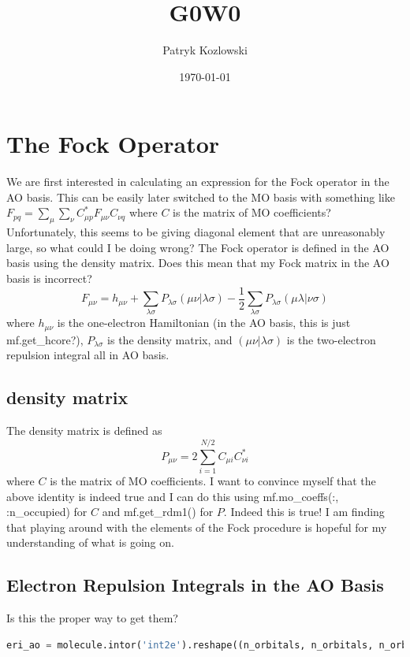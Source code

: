 \documentclass[12pt]{article}
\author{Patryk Kozlowski}
\title{G0W0}
\date{\today}
\begin{document}
\maketitle
\section{The Fock Operator}
We are first interested in calculating an expression for the Fock operator in the AO basis. This can be easily later switched to the MO basis with something like $F_{pq} = \sum_{\mu} \sum_{\nu} C_{\mu p}^{*}F_{\mu\nu}C_{\nu q}$ where $C$ is the matrix of MO coefficients? Unfortunately, this seems to be giving diagonal element that are unreasonably large, so what could I be doing wrong? 
The Fock operator is defined in the AO basis using the density matrix. Does this mean that my Fock matrix in the AO basis is incorrect? 
\begin{equation}
F_{\mu\nu} = h_{\mu\nu} + \sum_{\lambda\sigma}P_{\lambda\sigma}(\mu\nu|\lambda\sigma) - \frac{1}{2}\sum_{\lambda\sigma}P_{\lambda\sigma}(\mu\lambda|\nu\sigma)
\end{equation}
where $h_{\mu\nu}$ is the one-electron Hamiltonian (in the AO basis, this is just mf.get\_hcore?), $P_{\lambda\sigma}$ is the density matrix, and $(\mu\nu|\lambda\sigma)$ is the two-electron repulsion integral all in AO basis.
\subsection{density matrix}
The density matrix is defined as
\begin{equation}
P_{\mu\nu} = 2\sum_{i=1}^{N/2}C_{\mu i}C_{\nu i}^{*}
\end{equation}
where $C$ is the matrix of MO coefficients. I want to convince myself that the above identity is indeed true and I can do this using mf.mo\_coeffs(:, :n\_occupied) for $C$ and mf.get\_rdm1() for $P$. Indeed this is true! I am finding that playing around with the elements of the Fock procedure is hopeful for my understanding of what is going on.
\subsection{Electron Repulsion Integrals in the AO Basis}
Is this the proper way to get them?
\begin{lstlisting}[language=Python]
eri_ao = molecule.intor('int2e').reshape((n_orbitals, n_orbitals, n_orbitals, n_orbitals))
\end{lstlisting}
\end{document}
